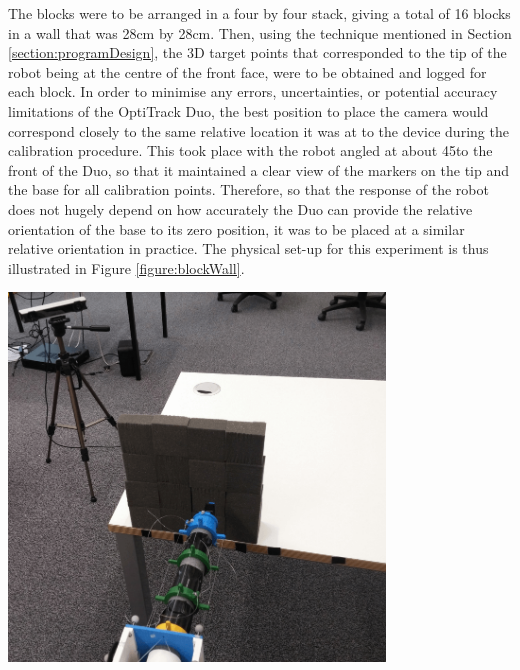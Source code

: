 \documentclass[11pt]{article}
\begin{document}
The blocks were to be arranged in a four by four stack, giving a total of 16 blocks in a wall that was 28cm by 28cm. Then, using the technique mentioned in Section \ref{section:programDesign}, the 3D target points that corresponded to the tip of the robot being at the centre of the front face, were to be obtained and logged for each block. In order to minimise any errors, uncertainties, or potential accuracy limitations of the OptiTrack Duo, the best position to place the camera would correspond closely to the same relative location it was at to the device during the calibration procedure. This took place with the robot angled at about 45\degree to the front of the Duo, so that it maintained a clear view of the markers on the tip and the base for all calibration points. Therefore, so that the response of the robot does not hugely depend on how accurately the Duo can provide the relative orientation of the base to its zero position, it was to be placed at a similar relative orientation in practice. The physical set-up for this experiment is thus illustrated in Figure \ref{figure:blockWall}.


\begin{center}
\includegraphics[width=0.75\textwidth]{images/blockWall.png}
\label{figure:blockWall}
\end{center}
\end{document}
